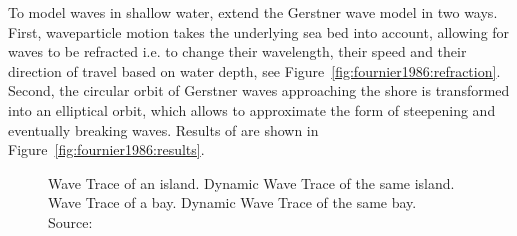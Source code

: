 To model waves in shallow water, \citeauthor{Fournier:1986} extend the Gerstner
wave model in two ways. First, waveparticle motion takes the underlying sea
bed into account, allowing for waves to be refracted i.e. to change their wavelength,
their speed and their direction of travel based on water depth, see Figure~\ref{fig:fournier1986:refraction}.
Second, the circular orbit of Gerstner waves approaching the shore is
transformed into an elliptical orbit, which allows to approximate the form of
steepening and eventually breaking waves.
Results of \cite{Fournier:1986} are shown in Figure~\ref{fig:fournier1986:results}.
%
\begin{figure}[h!]
 \centering
 \hfill
 \hfill
 \hfill
 \caption{
  Wave Trace of an island.
  Dynamic Wave Trace of the same island.
  Wave Trace of a bay.
  Dynamic Wave Trace of the same bay.
 Source:~\cite{Gonzato:1997}
 }
 \label{fig:gonzato1997:results}
\end{figure}
%

